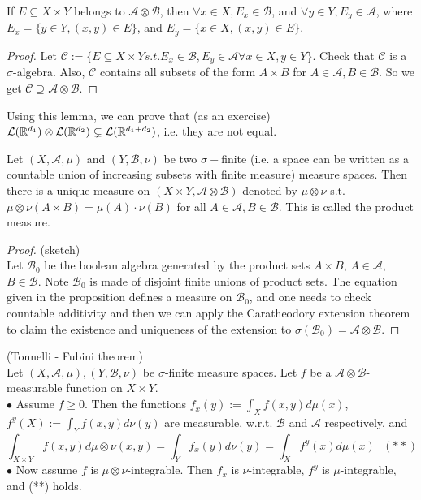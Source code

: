 \documentclass[a4paper]{article}
\begin{document}
\begin{lemma}
If $E \subseteq X \times Y$ belongs to $\mathcal{A} \otimes \mathcal{B}$, then $\forall x \in X, E_x \in \mathcal{B}$, and $\forall y \in Y, E_y \in \mathcal{A}$, where $E_x = \{y \in Y, (x,y) \in E\}$, and $E_y = \{x \in X, (x,y) \in E\}$.
\begin{proof}
Let $\mathcal{C} := \{E \subseteq X \times Y s.t. E_x \in \mathcal{B}, E_y \in \mathcal{A} \forall x \in X, y \in Y\}$. Check that $\mathcal{C}$ is a $\sigma$-algebra. Also, $\mathcal{C}$ contains all subsets of the form $A \times B$ for $A \in \mathcal{A}, B \in \mathcal{B}$. So we get $\mathcal{C} \supseteq \mathcal{A} \otimes \mathcal{B}$.
\end{proof}
\end{lemma}

Using this lemma, we can prove that (as an exercise) $\mathcal{L}(\mathbb{R}^{d_1}) \otimes \mathcal{L}(\mathbb{R}^{d_2}) \subsetneq \mathcal{L}(\mathbb{R}^{d_1+d_2})$, i.e. they are not equal.

\begin{prop}
Let $(X,\mathcal{A},\mu)$ and $(Y,\mathcal{B},\nu)$ be two $\sigma-$finite (i.e. a space can be written as a countable union of increasing subsets with finite measure) measure spaces. Then there is a unique measure on $(X \times Y, \mathcal{A} \otimes \mathcal{B})$ denoted by $\mu \otimes \nu$ s.t. $\mu \otimes \nu(A \times B) = \mu(A) \cdot \nu(B)$ for all $A \in \mathcal{A},B \in \mathcal{B}$. This is called the product measure.
\begin{proof} (sketch)\\
Let $\mathcal{B}_0$ be the boolean algebra generated by the product sets $A \times B$, $A \in \mathcal{A}$, $B \in \mathcal{B}$. Note $\mathcal{B}_0$ is made of disjoint finite unions of product sets. The equation given in the proposition defines a measure on $\mathcal{B}_0$, and one needs to check countable additivity and then we can apply the Caratheodory extension theorem to claim the existence and uniqueness of the extension to $\sigma(\mathcal{B}_0) =\mathcal{A} \otimes \mathcal{B}$.
\end{proof}
\end{prop}

\begin{thm} (Tonnelli - Fubini theorem)\\
Let $(X,\mathcal{A},\mu), (Y,\mathcal{B},\nu)$ be $\sigma$-finite measure spaces. Let $f$ be a $\mathcal{A}\otimes \mathcal{B}$-measurable function on $X \times Y$.\\
$\bullet$ Assume $f \geq 0$. Then the functions $f_x(y) := \int_X f(x,y) d\mu(x)$, $f^y(X) := \int_Y f(x,y) d\nu(y)$ are measurable, w.r.t. $\mathcal{B}$ and $\mathcal{A}$ respectively, and $$\int_{X \times Y} f(x,y) d\mu \otimes \nu(x,y) = \int_Y f_x(y) d\nu(y) = \int_X f^y (x) d\mu (x) \ \ \    (**)$$
$\bullet$ Now assume $f$ is $\mu \otimes \nu$-integrable. Then $f_x$ is $\nu$-integrable, $f^y$ is $\mu$-integrable, and (**) holds.
\end{thm}
\end{document}
